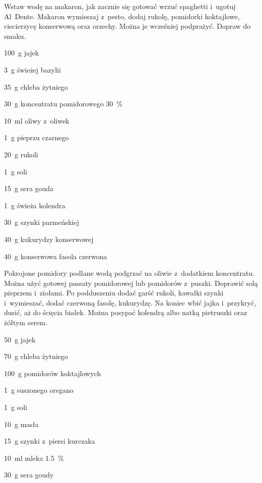 \documentclass[../kucharek.tex]{subfiles}
\begin{document}
Wstaw wodę na makaron, jak zacznie się gotować wrzuć spaghetti i~ugotuj
Al~Dente. Makaron wymieszaj z~pesto, dodaj rukolę, pomidorki koktajlowe,
ciecierzycę konserwową oraz orzechy. Można je wcześniej podprażyć. Dopraw do
smaku.


\begin{Ingred}
    \item \qty{100}{\gram} jajek
    \item \qty{3}{\gram} świeżej bazylii
    \item \qty{35}{\gram} chleba żytniego
    \item \qty{30}{\gram} koncentratu pomidorowego \qty{30}{\percent}
    \item \qty{10}{\milli\litre} oliwy z~oliwek
    \item \qty{1}{\gram} pieprzu czarnego
    \item \qty{20}{\gram} rukoli
    \item \qty{1}{\gram} soli
    \item \qty{15}{\gram} sera gouda
    \item \qty{1}{\gram} świeża kolendra
    \item \qty{30}{\gram} szynki parmeńskiej
    \item \qty{40}{\gram} kukurydzy konserwowej
    \item \qty{40}{\gram} konserwowa fasola czerwona
\end{Ingred}

Pokrojone pomidory podlane wodą podgrzać na oliwie z~dodatkiem koncentratu.
Można użyć gotowej passaty pomidorowej lub pomidorów z~puszki. Doprawić solą
pieprzem i~ziołami. Po podduszeniu dodać garść rukoli, kawałki szynki
i~wymieszać, dodać czerwoną fasolę, kukurydzę. Na koniec wbić jajka i~przykryć,
dusić, aż do ścięcia białek. Można posypać kolendrą albo natką pietruszki oraz
żółtym serem.


\begin{Ingred}
    \item \qty{50}{\gram} jajek
    \item \qty{70}{\gram} chleba żytniego
    \item \qty{100}{\gram} pomidorów koktajlowych
    \item \qty{1}{\gram} suszonego oregano
    \item \qty{1}{\gram} soli
    \item \qty{10}{\gram} masła
    \item \qty{15}{\gram} szynki z~piersi kurczaka
    \item \qty{10}{\milli\litre} mleka \qty{1.5}{\percent}
    \item \qty{30}{\gram} sera goudy
\end{Ingred}
\end{document}

